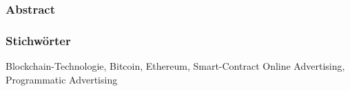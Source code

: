 \subsubsection{Abstract}

\subsubsection{Stichwörter}
Blockchain-Technologie, Bitcoin, Ethereum, Smart-Contract Online Advertising, Programmatic Advertising